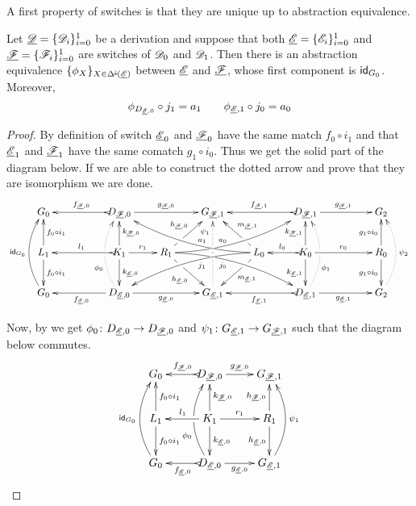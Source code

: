 A first property of switches is that they are unique up to abstraction equivalence.

\begin{lemma}
	\label{thm:switch_uni}
	Let $\underline{\mathscr{D}}=\{\mathscr{D}_{i}\}_{i=0}^1$ be a derivation and suppose
	that both $\underline{\mathscr{E}}=\{\mathscr{E}_i\}_{i=0}^1$ and
	$\underline{\mathscr{F}}=\{\mathscr{F}_i\}_{i=0}^1$ are switches of $\mathscr{D}_0$ and
	$\mathscr{D}_1$. Then there is an abstraction equivalence $\{\phi_X\}_{X\in \Delta^{\hspace{-1pt}\downarrow\hspace{-1pt}}(\underline{\mathscr{E}})}$ between $\underline{\mathscr{E}}$ and $\underline{\mathscr{F}}$, whose first component is $\mathsf{id}_{G_0}$. Moreover, 
	\[\phi_{D_{\underline{\mathscr{E}}, 0}}\circ j_1=a_1 \qquad \phi_{\underline{\mathscr{E}}, 1}\circ j_0=a_0\]
\end{lemma}

\begin{proof}
	By definition of switch $\underline{\mathscr{E}}_0$ and $\underline{\mathscr{F}}_0$ have the same match $f_0\circ i_1$ and that $\underline{\mathscr{E}}_1$ and $\underline{\mathscr{F}}_1$ have the same comatch $g_1\circ i_0$. Thus we get the solid part of the diagram below. If we are able to construct the dotted arrow and prove that they are isomorphism we are done.
	\[\xymatrix@C=22pt{G_{0} && \ar@{>->}[ll]_{f_{\der{F},0}} D_{\der{F},0} \ar[rr]^{g_{\der{F},0}}&& G_{\der{F},1} && \ar@{>->}[ll]_{f_{\der{F},1}} D_{\der{F},1} \ar[rr]^{g_{\der{F},1}}&& G_{2}\\L_1 \ar[d]^{f_0\circ i_1} \ar[u]_{f_0\circ i_1}&& K_{1} \ar[d]^{k_{\der{E},0}} \ar[u]_{k_{\der{F},0}}\ar@{>->}[ll]_{l_1} \ar[r]^{r_1} & R_{1} \ar@/^.35cm/[drrr]|(.315)\hole_(.4){j_0} \ar[dr]|(.3)\hole_{h_{\der{E},0}} \ar@/_.35cm/[urrr]|(.315)\hole^(.4){a_0} \ar[ur]|(.3)\hole^{h_{\der{F},0}}& &L_{0} \ar@/_.35cm/[dlll]^(.4){j_1} \ar[dl]|(.3)\hole^{m_{\der{E},1}} \ar@/^.35cm/[ulll]_(.4){a_1} \ar[ul]|(.3)\hole_{m_{\der{F},1}}& K_{0} \ar[d]_{k_{\der{E},1}} \ar[u]^{k_{\der{F},1}}\ar@{>->}[l]_{l_{0}} \ar[rr]^{r_0} && R_{0} \ar[d]_{g_1\circ i_0} \ar[u]^{g_1\circ i_0}\\ \ar@/^.5cm/[uu]^{\id{G_0}} G_{0} && \ar[ll]^{f_{\der{E},0}} D_{\der{E},0} \ar@{.>}@/^.5cm/[uu]^(.33){\phi_{0}}|\hole \ar[rr]_{g_{\der{E},0}}&& G_{\der{E},1} \ar@{.>}[uu]^(.76){\psi_1}|(.45)\hole |(.55)\hole&& \ar@{>->}[ll]^{f_{\der{E},1}} D_{\der{E},1} \ar@{.>}@/_.5cm/[uu]_(.33){\phi_{1}}|\hole\ar[rr]_{g_{\der{E},1}}&& G_{2}\ar@{.>}@/_.5cm/[uu]_{\psi_2}}\]
	
	Now, by  we get $\phi_0\colon D_{\underline{\mathscr{E}},0}\to D_{\underline{\mathscr{F}},0}$ and $\psi_1 \colon G_{\underline{\mathscr{E}},1}\to G_{\underline{\mathscr{F}},1}$ such that the diagram below commutes.
	\[\xymatrix{G_{0} & \ar@{>->}[l]_{f_{\der{F},0}} D_{\der{F},0} \ar[r]^{g_{\der{F},0}}& G_{\der{F},1} \\L_1 \ar[d]^{f_0\circ i_1} \ar[u]_{f_0\circ i_1}& K_{1} \ar[d]^{k_{\der{E},0}} \ar[u]_{k_{\der{F},0}}\ar[l]_{l_1} \ar[r]^{r_1} & R_{1}  \ar[d]_{h_{\der{E},0}}  \ar[u]^{h_{\der{F},0}}\\ \ar@/^.5cm/[uu]^{\id{G_0}} G_{0} & \ar@{>->}[l]^{f_{\der{E},0}} D_{\der{E},0} \ar@/^.5cm/[uu]^(.33){\phi_{0}}|\hole \ar[r]_{g_{\der{E},0}}& G_{\der{E},1} \ar@/_.5cm/[uu]_{\psi_1}}\]
	

\end{proof}
